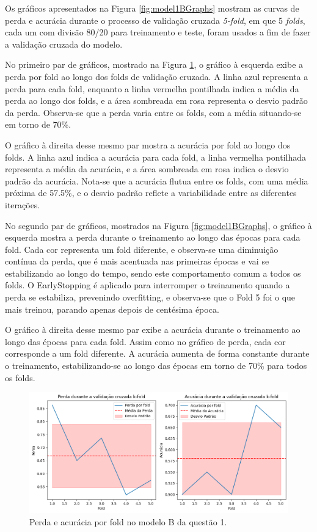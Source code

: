 \documentclass[12pt]{article}
\begin{document}
Os gráficos apresentados na Figura \ref{fig:model1BGraphs} mostram as curvas de perda e acurácia durante o processo de validação cruzada \textit{5-fold}, em que 5 \textit{folds}, cada um com divisão 80/20 para treinamento e teste, foram usados a fim de fazer a validação cruzada do modelo.

No primeiro par de gráficos, mostrado na Figura \ref{fig:model1Bfold}, o gráfico à esquerda exibe a perda por fold ao longo dos folds de validação cruzada. A linha azul representa a perda para cada fold, enquanto a linha vermelha pontilhada indica a média da perda ao longo dos folds, e a área sombreada em rosa representa o desvio padrão da perda. Observa-se que a perda varia entre os folds, com a média situando-se em torno de 70\%.

O gráfico à direita desse mesmo par mostra a acurácia por fold ao longo dos folds. A linha azul indica a acurácia para cada fold, a linha vermelha pontilhada representa a média da acurácia, e a área sombreada em rosa indica o desvio padrão da acurácia. Nota-se que a acurácia flutua entre os folds, com uma média próxima de 57.5\%, e o desvio padrão reflete a variabilidade entre as diferentes iterações.

No segundo par de gráficos, mostrados na Figura \ref{fig:model1BGraphs}, o gráfico à esquerda mostra a perda durante o treinamento ao longo das épocas para cada fold. Cada cor representa um fold diferente, e observa-se uma diminuição contínua da perda, que é mais acentuada nas primeiras épocas e vai se estabilizando ao longo do tempo, sendo este comportamento comum a todos os folds. O EarlyStopping é aplicado para interromper o treinamento quando a perda se estabiliza, prevenindo overfitting, e observa-se que o Fold 5 foi o que mais treinou, parando apenas depois de centésima época.

O gráfico à direita desse mesmo par exibe a acurácia durante o treinamento ao longo das épocas para cada fold. Assim como no gráfico de perda, cada cor corresponde a um fold diferente. A acurácia aumenta de forma constante durante o treinamento, estabilizando-se ao longo das épocas em torno de 70\% para todos os folds.

\begin{figure}[h]
    \centering
    \includegraphics[width=1\linewidth]{casoB1folds.png}
    \caption{Perda e acurácia por fold no modelo B da questão 1.}
    \label{fig:model1Bfold}
\end{figure}
\end{document}
